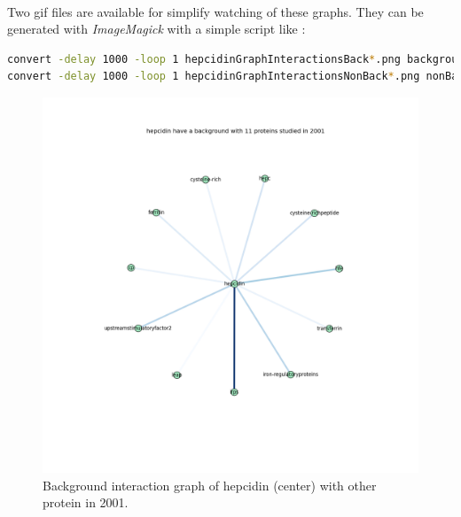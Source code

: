\documentclass{report} %
\begin{document}
        \paragraph*{}
        Two gif files are available for simplify watching of these graphs.
        They can be generated with \textit{ImageMagick} with a simple script like :
\begin{lstlisting}[language=bash]
convert -delay 1000 -loop 1 hepcidinGraphInteractionsBack*.png backgroundInteractions.gif
convert -delay 1000 -loop 1 hepcidinGraphInteractionsNonBack*.png nonBackgroundInteractions.gif
\end{lstlisting}
        \begin{figure}[H] 
                \centering
                \includegraphics[width=1.0\textwidth]{images/hepcidinGraphInteractionsBackground2001.png}
                \caption{Background interaction graph of hepcidin (center) with other protein in 2001.}
                \label{fig:interact2001BACK}
        \end{figure}
\end{document}
